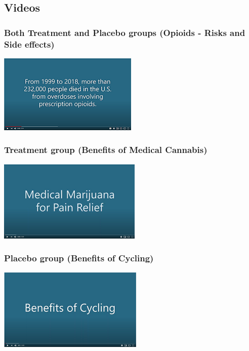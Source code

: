 \documentclass[
]{article}
\begin{document}
\hypertarget{videos}{%
\subsection{Videos}\label{videos}}

\hypertarget{both-treatment-and-placebo-groups-opioids---risks-and-side-effects}{%
\subsubsection{Both Treatment and Placebo groups (Opioids - Risks and
Side
effects)}\label{both-treatment-and-placebo-groups-opioids---risks-and-side-effects}}

\href{https://youtu.be/y0mfzDAs1BE}{\includegraphics{opioids.png}}

\hypertarget{treatment-group-benefits-of-medical-cannabis}{%
\subsubsection{Treatment group (Benefits of Medical
Cannabis)}\label{treatment-group-benefits-of-medical-cannabis}}

\href{https://youtu.be/OhJ0YaJXrJo}{\includegraphics{medical_marijuana.png}}

\hypertarget{placebo-group-benefits-of-cycling}{%
\subsubsection{Placebo group (Benefits of
Cycling)}\label{placebo-group-benefits-of-cycling}}

\href{https://youtu.be/xWo0FOwZVX0}{\includegraphics{cycling.png}}
\end{document}
